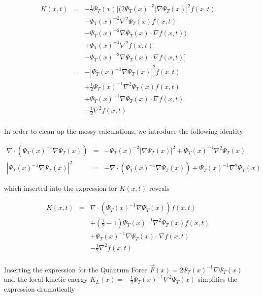 \begin{eqnarray*}
K(x, t) &=& -\frac{1}{2}\Psi_T(x)\Big[\big(2\Psi_T(x)^{-3}\left|\nabla\Psi_T(x)\right|^2f(x, t) \\
        & & - \Psi_T(x)^{-2}\nabla^2\Psi_T(x)f(x, t) \\
        & & - \Psi_T(x)^{-2}\nabla\Psi_T(x)\cdot\nabla f(x, t)\big) \\
        & & + \Psi_T(x)^{-1}\nabla^2 f(x, t) \\
        & & - \Psi_T(x)^{-2}\nabla\Psi_T(x)\cdot\nabla f(x, t)\Big] \\
        &=& - \left|\Psi_T(x)^{-1}\nabla\Psi_T(x)\right|^2f(x, t) \\
        & & + \frac{1}{2}\Psi_T(x)^{-1}\nabla^2\Psi_T(x)f(x, t) \\
        & & + \Psi_T(x)^{-1}\nabla\Psi_T(x)\cdot\nabla f(x, t) \\
        & & - \frac{1}{2}\nabla^2 f(x, t) \\
\end{eqnarray*}

In order to clean up the messy calculations, we introduce the following identity

\begin{eqnarray*}
 \nabla\cdot\left(\Psi_T(x)^{-1}\nabla\Psi_T(x)\right) &=& -\Psi_T(x)^{-2}\left|\nabla\Psi_T(x)\right|^2 + \Psi_T(x)^{-1}\nabla^2\Psi_T(x) \\
 \left|\Psi_T(x)^{-1}\nabla\Psi_T(x)\right|^2 &=& -\nabla\cdot\left(\Psi_T(x)^{-1}\nabla\Psi_T(x)\right) + \Psi_T(x)^{-1}\nabla^2\Psi_T(x)
\end{eqnarray*}

which inserted into the expression for $K(x, t)$ reveals

\begin{eqnarray*}
K(x, t) &=&  \nabla\cdot\left(\Psi_T(x)^{-1}\nabla\Psi_T(x)\right)f(x, t) \\
        & & + \left(\frac{1}{2} - 1\right)\Psi_T(x)^{-1}\nabla^2\Psi_T(x)f(x, t) \\
        & & + \Psi_T(x)^{-1}\nabla\Psi_T(x)\cdot\nabla f(x, t) \\
        & & - \frac{1}{2}\nabla^2 f(x, t) \\
\end{eqnarray*}

Inserting the expression for the Quantum Force $\vec F(x) = 2\Psi_T(x)^{-1}\nabla\Psi_T(x)$ and the local kinetic energy $K_L(x) = -\frac{1}{2}\Psi_T(x)^{-1}\nabla^2\Psi_T(x)$ simplifies the expression dramatically

